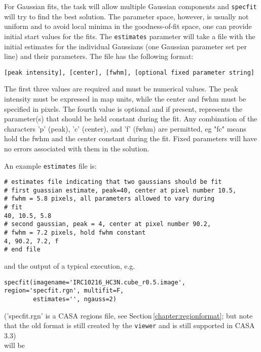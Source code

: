 For Gaussian fits, the task will allow multiple Gaussian components
and {\tt specfit} will try to find the best solution. The parameter
space, however, is usually not uniform and to avoid local minima in the
goodness-of-fit space, one can provide initial start values for the
fits. The {\tt estimates} parameter will take a file with the initial
estimates for the individual Gaussians (one Gaussian parameter set per
line) and their parameters. The
file has the following format:

{\tt [peak intensity], [center], [fwhm], [optional fixed parameter string]}

The first three values are required and must be numerical values. The
peak intensity must be expressed in map units, while the
center and fwhm must be specified in pixels. The fourth value is
optional and if present, represents the parameter(s)
that should be held constant during the fit. Any combination of the
characters 'p' (peak), 'c' (center), and 'f' (fwhm) are
permitted, eg "fc" means hold the fwhm and the center constant during
the fit. Fixed parameters will have no errors associated
with them in the solution. 

An example {\tt estimates} file is: 

\small
\begin{verbatim}
# estimates file indicating that two gaussians should be fit
# first guassian estimate, peak=40, center at pixel number 10.5, 
# fwhm = 5.8 pixels, all parameters allowed to vary during
# fit
40, 10.5, 5.8
# second gaussian, peak = 4, center at pixel number 90.2, 
# fwhm = 7.2 pixels, hold fwhm constant
4, 90.2, 7.2, f
# end file
\end{verbatim}
\normalsize



and the output of a typical execution, e.g. 

\small
\begin{verbatim}
specfit(imagename='IRC10216_HC3N.cube_r0.5.image', region='specfit.rgn', multifit=F,
        estimates='', ngauss=2)
\end{verbatim}
\normalsize
('specfit.rgn' is a CASA regions file, see
Section\,\ref{chapter:regionformat}; but note that the old format is
still created by the {\tt viewer} and is still supported in CASA 3.3)\\

will be 


